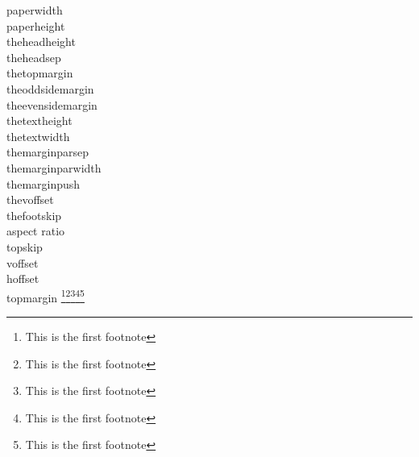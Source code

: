 \documentclass[12pt]{book}
\def\aspectratio{\pgfmathparse{\paperheight/\paperwidth} \pgfmathresult}
\def\printgeometryvalues{\leavevmode
paperwidth \the\paperwidth\\
paperheight \the\paperheight\\
theheadheight \the\headheight\\
theheadsep \the\headsep\\
thetopmargin \the\topmargin\\
theoddsidemargin \the\oddsidemargin\\
theevensidemargin\the\evensidemargin\\
thetextheight\the\textheight\\
thetextwidth \the\textwidth\\
themarginparsep \the\marginparsep\\
themarginparwidth \the\marginparwidth\\
themarginpush \the\marginparpush\\
thevoffset \the\voffset\\
thefootskip \the\footskip\\
aspect ratio \aspectratio\\
topskip \the\topskip\\
voffset \the\voffset\\
hoffset \the\hoffset\\
topmargin\the\topmargin}
\begin{document}
%
%

\printlayout\clearpage

\printlayout

\printgeometryvalues
\footnote{This is the first footnote}\footnote{This is the first footnote}\footnote{This is the first footnote}\footnote{This is the first footnote}\footnote{This is the first footnote}
%
\end{document}
